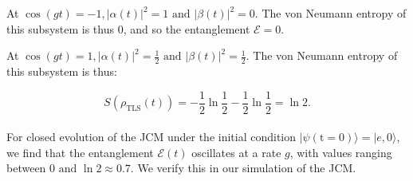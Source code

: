 \documentclass[11pt]{article}
\begin{document}
At $\cos(gt) = -1, |\alpha(t)|^2 = 1 \text{ and } |\beta(t)|^2 = 0$. The von Neumann entropy of this subsystem is thus $0$, and so the entanglement $\mathcal{E}=0$.

At $\cos(gt) = 1, |\alpha(t)|^2 = \frac{1}{2} \text{ and } |\beta(t)|^2 = \frac{1}{2}$. The von Neumann entropy of this subsystem is thus:

\begin{equation*}
    S(\rho_{\scriptscriptstyle \text{TLS}}(t)) = - \frac{1}{2}\ln\frac{1}{2} - \frac{1}{2}\ln\frac{1}{2}
    = \ln2.
\end{equation*}
\\
For closed evolution of the JCM under the initial condition $|\psi(\text{t} = 0)\rangle = |e,0\rangle$, we find that the entanglement $\mathcal{E}(t)$ oscillates at a rate $g$, with values ranging between $0 \text{ and } \ln2 \approx 0.7$. We verify this in our simulation of the JCM.\\
\end{document}
